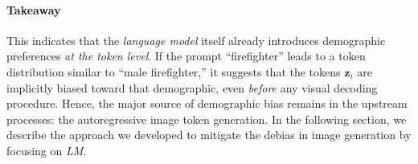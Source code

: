 \paragraph{Takeaway} This indicates that the \emph{language model} itself already introduces demographic preferences \emph{at the token level}. If the prompt ``firefighter'' leads to a token distribution similar to ``male firefighter,'' it suggests that the tokens $\mathbf{z}_i$ are implicitly biased toward that demographic, even \emph{before} any visual decoding procedure. Hence, the major source of demographic bias remains in the upstream processes: the autoregressive image token generation. In the following section, we describe the approach we developed to mitigate the debias in image generation by focusing on \emph{LM}.




